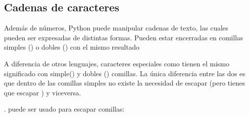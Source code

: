 \documentclass[a5paper,10pt,spanish]{sphinxmanual}
\begin{document}
\subsection{Cadenas de caracteres}
\label{\detokenize{tutorial/introduction:strings}}\label{\detokenize{tutorial/introduction:tut-strings}}
\sphinxAtStartPar
Además de números, Python puede manipular cadenas de texto, las cuales pueden ser expresadas de distintas formas. Pueden estar encerradas en comillas simples () o dobles ()  con el mismo resultado %
\begin{footnote}[2]\sphinxAtStartFootnote
A diferencia de otros lenguajes, caracteres especiales como  tienen el mismo significado con simple() y dobles () comillas. La única diferencia entre las dos es que dentro de las comillas simples no existe la necesidad de escapar  (pero tienes que escapar ) y viceversa.
%
\end{footnote}.  \sphinxcode{\sphinxupquote{\textbackslash{}}} puede ser usado para escapar comillas:

\begin{sphinxVerbatim}[commandchars=\\\{\}]
  
  
  
\end{sphinxVerbatim}
\end{document}
